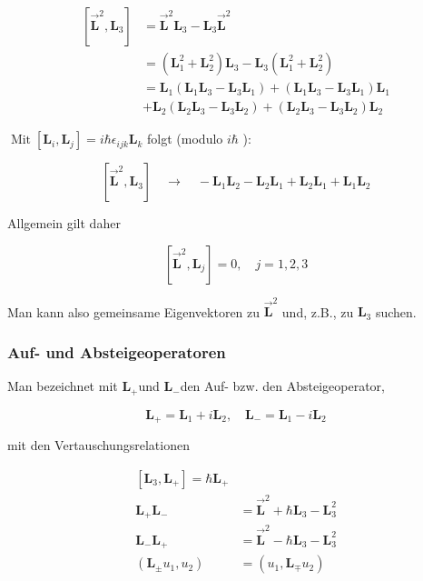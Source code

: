 \documentclass[10pt, letterpaper]{article}
\begin{document}
$$
\begin{aligned}
{\left[\overrightarrow{\mathbf{L}}^{2}, \mathbf{L}_{3}\right] } & =\overrightarrow{\mathbf{L}}^{2} \mathbf{L}_{3}-\mathbf{L}_{3} \overrightarrow{\mathbf{L}}^{2} \\
& =\left(\mathbf{L}_{1}^{2}+\mathbf{L}_{2}^{2}\right) \mathbf{L}_{3}-\mathbf{L}_{3}\left(\mathbf{L}_{1}^{2}+\mathbf{L}_{2}^{2}\right) \\
& =\mathbf{L}_{1}\left(\mathbf{L}_{1} \mathbf{L}_{3}-\mathbf{L}_{3} \mathbf{L}_{1}\right)+\left(\mathbf{L}_{1} \mathbf{L}_{3}-\mathbf{L}_{3} \mathbf{L}_{1}\right) \mathbf{L}_{1} \\
& +\mathbf{L}_{2}\left(\mathbf{L}_{2} \mathbf{L}_{3}-\mathbf{L}_{3} \mathbf{L}_{2}\right)+\left(\mathbf{L}_{2} \mathbf{L}_{3}-\mathbf{L}_{3} \mathbf{L}_{2}\right) \mathbf{L}_{2}
\end{aligned}
$$

$\operatorname{Mit}\left[\mathbf{L}_{i}, \mathbf{L}_{j}\right]=i \hbar \epsilon_{i j k} \mathbf{L}_{k}$ folgt (modulo $i \hbar$ ):

$$
\left[\overrightarrow{\mathbf{L}}^{2}, \mathbf{L}_{3}\right] \quad \rightarrow \quad-\mathbf{L}_{1} \mathbf{L}_{2}-\mathbf{L}_{2} \mathbf{L}_{1}+\mathbf{L}_{2} \mathbf{L}_{1}+\mathbf{L}_{1} \mathbf{L}_{2}
$$

Allgemein gilt daher

$$
\left[\overrightarrow{\mathbf{L}}^{2}, \mathbf{L}_{j}\right]=0, \quad j=1,2,3
$$

Man kann also gemeinsame Eigenvektoren zu $\overrightarrow{\mathbf{L}}^{2}$ und, z.B., zu $\mathbf{L}_{3}$ suchen.

\subsubsection*{Auf- und Absteigeoperatoren}
Man bezeichnet mit $\mathbf{L}_{+}$und $\mathbf{L}_{-}$den Auf- bzw. den Absteigeoperator,

$$
\mathbf{L}_{+}=\mathbf{L}_{1}+i \mathbf{L}_{2}, \quad \mathbf{L}_{-}=\mathbf{L}_{1}-i \mathbf{L}_{2}
$$

mit den Vertauschungsrelationen

$$
\begin{aligned}
{\left[\mathbf{L}_{3}, \mathbf{L}_{+}\right]=\hbar \mathbf{L}_{+} } & \\
\mathbf{L}_{+} \mathbf{L}_{-} & =\overrightarrow{\mathbf{L}}^{2}+\hbar \mathbf{L}_{3}-\mathbf{L}_{3}^{2} \\
\mathbf{L}_{-} \mathbf{L}_{+} & =\overrightarrow{\mathbf{L}}^{2}-\hbar \mathbf{L}_{3}-\mathbf{L}_{3}^{2} \\
\left(\mathbf{L}_{ \pm} u_{1}, u_{2}\right) & =\left(u_{1}, \mathbf{L}_{\mp} u_{2}\right)
\end{aligned}
$$
\end{document}
